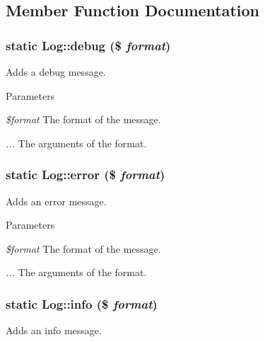 \subsection{Member Function Documentation}
\hypertarget{classLog_a9cbcd40831b44a7fc43494d32544ca45}{
\subsubsection[{debug}]{\setlength{\rightskip}{0pt plus 5cm}static Log::debug (\$ {\em format})}}
\label{classLog_a9cbcd40831b44a7fc43494d32544ca45}
Adds a debug message.


\begin{DoxyParams}{Parameters}
\item[{\em \$format}]The format of the message. \item[{\em ...}]The arguments of the format. \end{DoxyParams}
\hypertarget{classLog_ae64520f1abc38b59df669bd62174317e}{
\subsubsection[{error}]{\setlength{\rightskip}{0pt plus 5cm}static Log::error (\$ {\em format})}}
\label{classLog_ae64520f1abc38b59df669bd62174317e}
Adds an error message.


\begin{DoxyParams}{Parameters}
\item[{\em \$format}]The format of the message. \item[{\em ...}]The arguments of the format. \end{DoxyParams}
\hypertarget{classLog_aad760acd04b0f64236f8d90519a3bef8}{
\subsubsection[{info}]{\setlength{\rightskip}{0pt plus 5cm}static Log::info (\$ {\em format})}}
\label{classLog_aad760acd04b0f64236f8d90519a3bef8}
Adds an info message.


